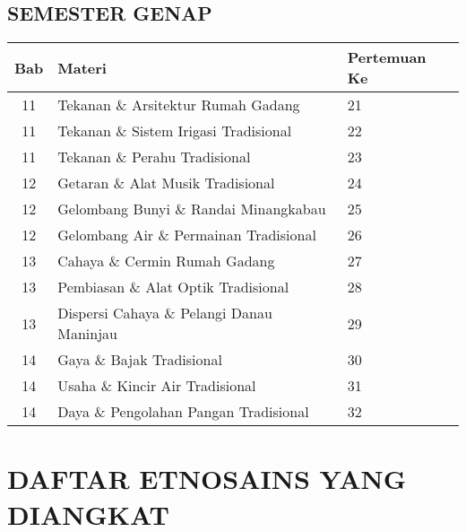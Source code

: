 \documentclass[12pt,a4paper]{article}
\begin{document}
\begin{tcolorbox}[colback=white, colframe=black, breakable, title=\textbf{Daftar LKPD IPA Kelas VIII Berbasis Model KESAN}]
\begin{longtable}{|c|p{12cm}|p{2cm}|}
\end{longtable}

\subsection*{SEMESTER GENAP}
\begin{longtable}{|c|p{12cm}|p{2cm}|}
\hline
\textbf{Bab} & \textbf{Materi} & \textbf{Pertemuan Ke} \\
\hline

11 & Tekanan \& Arsitektur Rumah Gadang & 21 \\
\hline
11 & Tekanan \& Sistem Irigasi Tradisional & 22 \\
\hline
11 & Tekanan \& Perahu Tradisional & 23 \\
\hline
12 & Getaran \& Alat Musik Tradisional & 24 \\
\hline
12 & Gelombang Bunyi \& Randai Minangkabau & 25 \\
\hline
12 & Gelombang Air \& Permainan Tradisional & 26 \\
\hline
13 & Cahaya \& Cermin Rumah Gadang & 27 \\
\hline
13 & Pembiasan \& Alat Optik Tradisional & 28 \\
\hline
13 & Dispersi Cahaya \& Pelangi Danau Maninjau & 29 \\
\hline
14 & Gaya \& Bajak Tradisional & 30 \\
\hline
14 & Usaha \& Kincir Air Tradisional & 31 \\
\hline
14 & Daya \& Pengolahan Pangan Tradisional & 32 \\
\hline

\end{longtable}

\end{tcolorbox}

\newpage

\section*{\centering DAFTAR ETNOSAINS YANG DIANGKAT}
\end{document}
